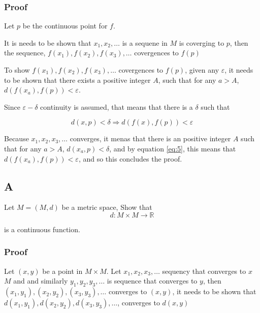 \documentclass[11pt]{article}
\begin{document}
\subsubsection{Proof}
\label{sec:org82caff8}
Let \(p\) be the continuous point for \(f\).

It is needs to be shown that  \(x_1, x_2, \ldots\) is a sequene in \(M\) is
coverging to \(p\), then the sequence, \(f(x_1), f(x_2), f(x_3), \ldots\)
covergences to \(f(p)\)


To show \(f(x_1), f(x_2), f(x_3), \ldots\)
covergences to \(f(p)\), given any \(\varepsilon\), it needs to be shown that there
exists a positive integer \(A\), such that for any \(a > A\), \(d(f(x_a), f(p)) < \varepsilon\).

Since \(\varepsilon -\delta\) continuity is assumed, that means that there is a
\(\delta\) such that

\begin{equation}
\label{eq:5}
d(x, p) < \delta \Rightarrow d(f(x), f(p)) < \varepsilon
\end{equation}

Because \(x_1, x_2, x_3, \ldots\) converges, it menas that there is an
positive integer \(A\) such that for any \(a > A\), \(d(x_{a}, p) < \delta\), and by equation
\ref{eq:5}, this means that \(d(f(x_{a}), f(p)) < \varepsilon\), and so this
concludes the proof.


\subsection{A}
\label{sec:org6fbe76d}
Let \(M = (M, d)\) be a metric space, Show that
\begin{equation}
\label{eq:6}
d: M \times M \rightarrow \mathbb{R}
\end{equation}

is a continuous function.

\subsubsection{Proof}
\label{sec:orgad68f92}

Let \((x, y)\) be a point in \(M \times M\). Let \(x_1, x_2, x_3, \ldots\)
sequency that converges to \(x\) \(M\) and and similarly \(y_1, y_2, y_3,
\ldots\) is sequence that converges to \(y\), then \((x_{1}, y_1), (x_{2}, y_2),
(x_{3}, y_3), \ldots\) converges to \((x, y)\),  it needs to be shown that \(d(x_{1}, y_1), d(x_{2}, y_2),
d(x_{3}, y_3), \ldots\), converges to \(d(x, y)\)
\end{document}
